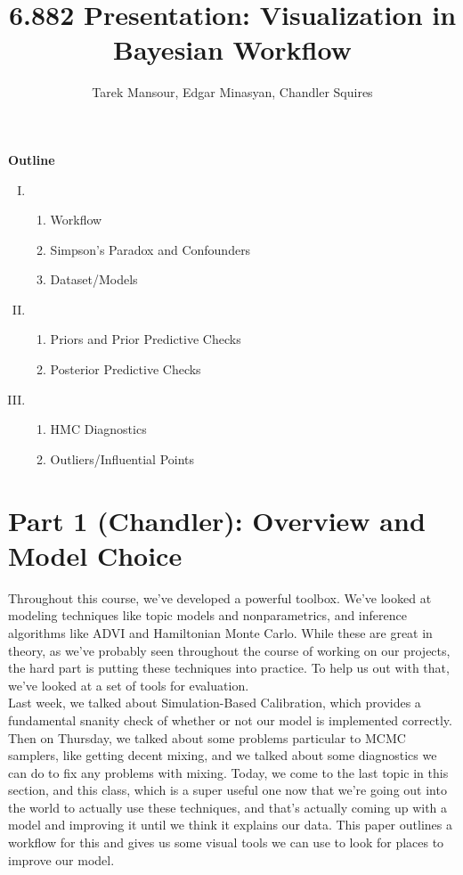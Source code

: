 \documentclass[]{article}
\title{6.882 Presentation: Visualization in Bayesian Workflow}
\author{Tarek Mansour, Edgar Minasyan, Chandler Squires}
\date{}
\begin{document}
\maketitle
\thispagestyle{empty}

\textbf{Outline}
\begin{enumerate}[I.]
	\item \begin{enumerate}[1)]
		\item Workflow
		\item Simpson's Paradox and Confounders
		\item Dataset/Models
	\end{enumerate}
	\item \begin{enumerate}[1)]
		\item Priors and Prior Predictive Checks
		\item Posterior Predictive Checks
	\end{enumerate}
	\item \begin{enumerate}[1)]
		\item HMC Diagnostics
		\item Outliers/Influential Points
	\end{enumerate}
\end{enumerate}

\section*{Part 1 (Chandler): Overview and Model Choice}

Throughout this course, we've developed a powerful toolbox. We've looked at modeling techniques like topic models and nonparametrics, and inference algorithms like ADVI and Hamiltonian Monte Carlo. While these are great in theory, as we've probably seen throughout the course of working on our projects, the hard part is putting these techniques into practice. To help us out with that, we've looked at a set of tools for evaluation.
\\

Last week, we talked about Simulation-Based Calibration, which provides a fundamental snanity check of whether or not our model is implemented correctly. Then on Thursday, we talked about some problems particular to MCMC samplers, like getting decent mixing, and we talked about some diagnostics we can do to fix any problems with mixing. Today, we come to the last topic in this section, and this class, which is a super useful one now that we're going out into the world to actually use these techniques, and that's actually coming up with a model and improving it until we think it explains our data. This paper outlines a workflow for this and gives us some visual tools we can use to look for places to improve our model.
\\
\end{document}
